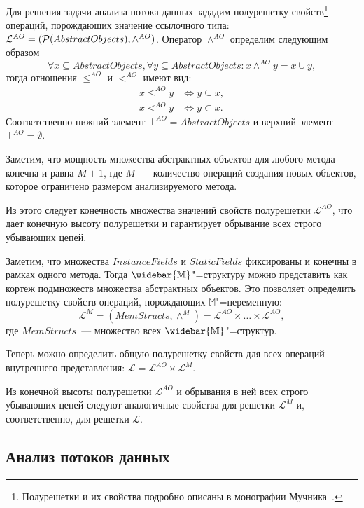 \documentclass[14pt,titlepage,draft]{extarticle}
\newcommand{\M}{\ensuremath{\mathbb{M}}}
\newcommand{\Ms}{\ensuremath{\mathbb{\widebar{M}}}}
\newcommand{\Lattice}{\mathcal{L}}
\newcommand{\meet}{\wedge}
\begin{document}
    Для решения задачи анализа потока данных зададим полурешетку
    свойств\footnote{
      Полурешетки и их свойства подробно описаны в монографии
      Мучника~\cite{muchnick}.
    }
    операций, порождающих значение ссылочного типа:
    $\Lattice^{AO} = (\powerset{AbstractObjects}, \meet^{AO})$.
    Оператор $\meet^{AO}$ определим следующим образом
    \[
      \forall x \subseteq AbstractObjects, \forall y \subseteq AbstractObjects
      \colon
      x \meet^{AO} y = x \cup y,
    \]
    тогда отношения $\leq^{AO}$ и $<^{AO}$ имеют вид:
    \begin{align*}
      x \leq^{AO} y &\Leftrightarrow y \subseteq x, \\
      x <^{AO} y &\Leftrightarrow y \subset x.
    \end{align*}
    Соответственно нижний элемент $\bot^{AO} = AbstractObjects$
    и верхний элемент $\top^{AO} = \emptyset$.

    Заметим, что мощность множества абстрактных объектов для любого
    метода конечна и равна $M + 1$,
    где $M$~--- количество операций создания новых объектов, которое ограничено
    размером анализируемого метода.

    Из этого следует конечность множества значений свойств полурешетки
    $\Lattice^{AO}$, что дает конечную высоту полурешетки и гарантирует
    обрывание всех строго убывающих цепей.

    Заметим, что множества $InstanceFields$ и $StaticFields$ фиксированы и
    конечны в рамках одного метода.
    Тогда \Ms"=структуру можно представить как кортеж подмножеств множества
    абстрактных объектов.
    Это позволяет определить полурешетку свойств операций, порождающих
    \M"=переменную:
    \[ \Lattice^M = (MemStructs, \meet^M) =
      \Lattice^{AO} \times \ldots \times \Lattice^{AO},\]
    где $MemStructs$~--- множество всех \Ms"=структур.

    Теперь можно определить общую полурешетку свойств для всех операций
    внутреннего представления: $\Lattice = \Lattice^{AO} \times \Lattice^M$.

    Из конечной высоты полурешетки $\Lattice^{AO}$
    и обрывания в ней всех строго убывающих цепей следуют аналогичные свойства
    для решетки $\Lattice^M$ и, соответственно, для решетки $\Lattice$.

  \subsection{Анализ потоков данных}
\end{document}
